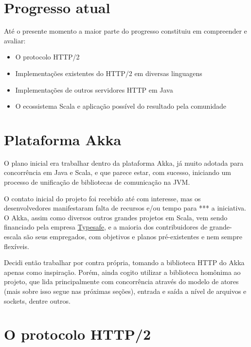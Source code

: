 \documentclass[12pt,a4paper,openright,twoside,]{abntex2}	%
\begin{document}
\section{Progresso atual}\label{progresso-atual}

Até o presente momento a maior parte do progresso constituiu em
compreender e avaliar:

\begin{itemize}
\tightlist
\item
  O protocolo HTTP/2\\
\item
  Implementações existentes do HTTP/2 em diversas linguagens\\
\item
  Implementações de outros servidores HTTP em Java\\
\item
  O ecossistema Scala e aplicação possível do resultado pela comunidade
\end{itemize}

\section{Plataforma Akka}\label{plataforma-akka}

O plano inicial era trabalhar dentro da plataforma Akka, já muito
adotada para concorrência em Java e Scala, e que parece estar, com
sucesso, iniciando um processo de unificação de bibliotecas de
comunicação na JVM.

O contato inicial do projeto foi recebido até com interesse, mas os
desenvolvedores manifestaram falta de recursos e/ou tempo para *** a
iniciativa. O Akka, assim como diversos outros grandes projetos em
Scala, vem sendo financiado pela empresa
\href{http://typesafe.com}{Typesafe}, e a maioria dos contribuidores de
grande-escala são seus empregados, com objetivos e planos pré-existentes
e nem sempre flexíveis.

Decidi então trabalhar por contra própria, tomando a biblioteca HTTP do
Akka apenas como inspiração. Porém, ainda cogito utilizar a biblioteca
homônima ao projeto, que lida principalmente com concorrência através do
modelo de atores (mais sobre isso segue nas próximas seções), entrada e
saída a nível de arquivos e sockets, dentre outros.

\section{O protocolo HTTP/2}\label{o-protocolo-http2}
\end{document}
